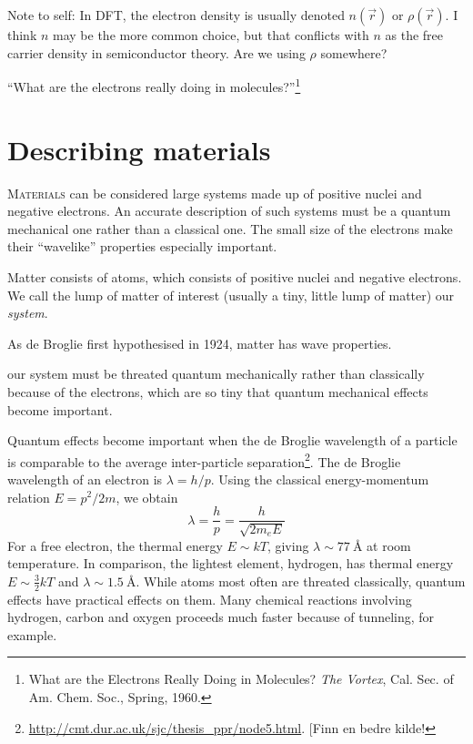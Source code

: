 \documentclass[11pt]{scrbook}   %
\begin{document}
Note to self: In DFT, the electron density is usually denoted $n(\vec{r})$ or
$\rho(\vec{r})$. I think $n$ may be the more common choice, but that conflicts
with $n$ as the free carrier density in semiconductor theory. Are we using
$\rho$ somewhere?

``What are the electrons really doing in molecules?''\footnote{What are the
Electrons Really Doing in Molecules? \textit{The Vortex}, Cal. Sec. of
Am. Chem. Soc., Spring, 1960.}

\section{Describing materials}

\lettrine[lines=3,slope=0pt,nindent=0pt]{M}{aterials}
can be considered large systems made up of positive nuclei and 
negative electrons. An accurate description of such systems must be a 
quantum mechanical one rather than a classical one. The small size of the
electrons make their ``wavelike'' properties especially important.

Matter consists of atoms, which consists of positive nuclei and negative 
electrons. We call the lump of matter of interest (usually a tiny, little lump
of matter) our \emph{system}. 

As de Broglie first hypothesised in 1924\cite{deBroglie:1924}, matter has wave
properties. 

our system must 
be threated quantum mechanically rather than classically because of the electrons, which are so tiny that quantum
mechanical effects become important. 

Quantum effects become important when the
de Broglie wavelength of a particle is comparable to the average inter-particle
separation\footnote{\url{http://cmt.dur.ac.uk/sjc/thesis_ppr/node5.html}. [Finn
en bedre kilde!}. The de Broglie wavelength of an electron is $\lambda=h/p$.
Using the classical energy-momentum relation $E=p^2/2m$, we obtain
\begin{equation}
  \lambda = \frac{h}{p} = \frac{h}{\sqrt{2m_eE}} 
  \label{eq:deBroglieWavelength}
\end{equation}
For a free electron, the thermal energy $E\sim kT$, 
giving $\lambda\sim\SI{77}{\angstrom}$ at
room temperature. In comparison, the lightest element, hydrogen, has thermal
energy $E\sim\frac32 kT$ and 
$\lambda\sim\SI{1.5}{\angstrom}$. While atoms most often are threated
classically, quantum effects have practical effects on them. Many
chemical reactions involving hydrogen, carbon and oxygen proceeds much faster
because of tunneling, for example.
\end{document}
